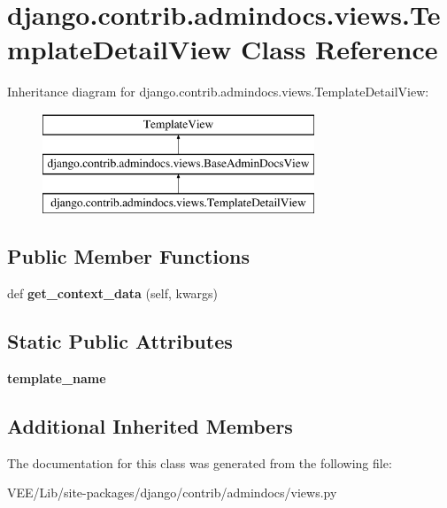 \hypertarget{classdjango_1_1contrib_1_1admindocs_1_1views_1_1_template_detail_view}{}\section{django.\+contrib.\+admindocs.\+views.\+Template\+Detail\+View Class Reference}
\label{classdjango_1_1contrib_1_1admindocs_1_1views_1_1_template_detail_view}
Inheritance diagram for django.\+contrib.\+admindocs.\+views.\+Template\+Detail\+View\+:\begin{figure}[H]
\begin{center}
\leavevmode
\includegraphics[height=3.000000cm]{classdjango_1_1contrib_1_1admindocs_1_1views_1_1_template_detail_view}
\end{center}
\end{figure}
\subsection*{Public Member Functions}
\begin{DoxyCompactItemize}
\item 
\mbox{\label{classdjango_1_1contrib_1_1admindocs_1_1views_1_1_template_detail_view_abb1c781de03a2b2e421cb86e04f32b41}} 
def {\bfseries get\+\_\+context\+\_\+data} (self, kwargs)
\end{DoxyCompactItemize}
\subsection*{Static Public Attributes}
\begin{DoxyCompactItemize}
\item 
\mbox{\label{classdjango_1_1contrib_1_1admindocs_1_1views_1_1_template_detail_view_a579576418c5727c5850e41825af12fba}} 
{\bfseries template\+\_\+name}
\end{DoxyCompactItemize}
\subsection*{Additional Inherited Members}


The documentation for this class was generated from the following file\+:\begin{DoxyCompactItemize}
\item 
V\+E\+E/\+Lib/site-\/packages/django/contrib/admindocs/views.\+py\end{DoxyCompactItemize}
